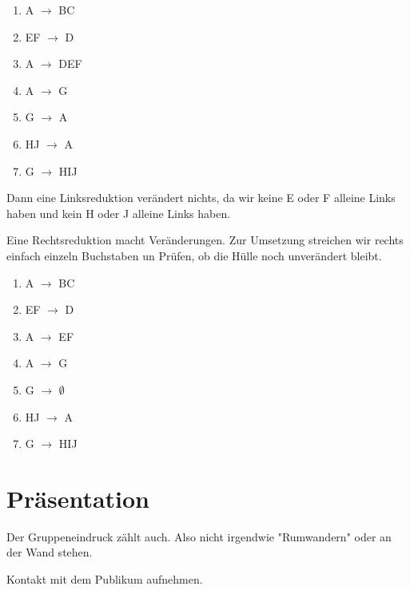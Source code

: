 \documentclass[a4paper]{article}
\begin{document}
\begin{enumerate}
    \item A $\rightarrow$ BC
    \item EF $\rightarrow$ D
    \item A $\rightarrow$ DEF
    \item A $\rightarrow$ G
    \item G $\rightarrow$ A
    \item HJ $\rightarrow$ A
    \item G $\rightarrow$ HIJ
\end{enumerate}

Dann eine Linksreduktion verändert nichts, da wir keine E oder F alleine Links haben und kein H oder J alleine Links haben.

Eine Rechtsreduktion macht Veränderungen. Zur Umsetzung streichen wir rechts einfach einzeln Buchstaben un Prüfen, ob die Hülle noch unverändert bleibt.

\begin{enumerate}
    \item A $\rightarrow$ BC
    \item EF $\rightarrow$ D
    \item A $\rightarrow$ EF
    \item A $\rightarrow$ G
    \item G $\rightarrow$ $\emptyset$
    \item HJ $\rightarrow$ A
    \item G $\rightarrow$ HIJ
\end{enumerate}

\section{Präsentation}

Der Gruppeneindruck zählt auch. Also nicht irgendwie "Rumwandern" oder an der Wand stehen.

Kontakt mit dem Publikum aufnehmen.

\end{document}
